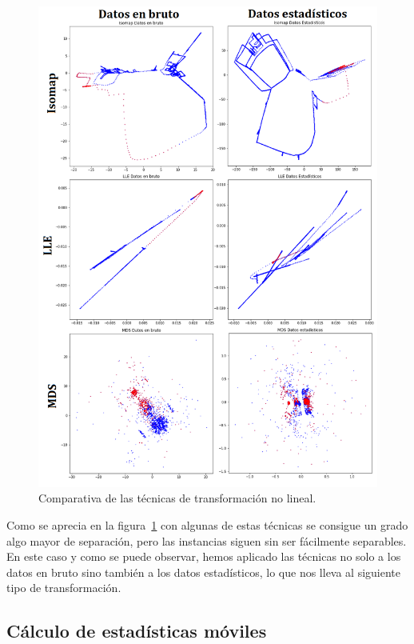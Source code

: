 \begin{figure}[H]
	\centering
	\includegraphics[width=1\textwidth]{../img/manifolds.png}
	\caption{Comparativa de las técnicas de transformación no lineal.}
	\label{fig:manifolds}
\end{figure}

Como se aprecia en la figura~\ref{fig:manifolds} con algunas de estas técnicas se consigue un grado algo mayor de separación, pero las instancias siguen sin ser fácilmente separables. En este caso y como se puede observar, hemos aplicado las técnicas no solo a los datos en bruto sino también a los datos estadísticos, lo que nos lleva al siguiente tipo de transformación. 

\subsection{Cálculo de estadísticas móviles}

